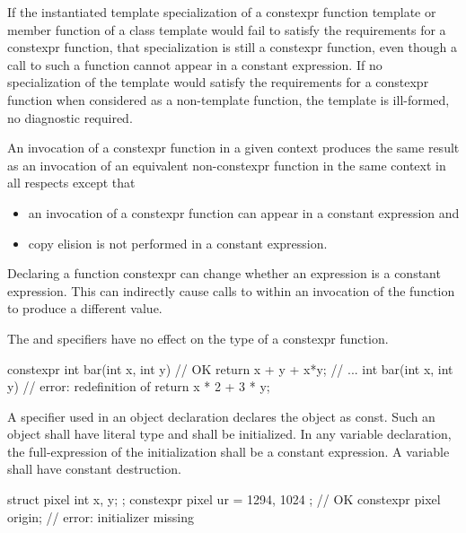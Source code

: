 \pnum
If the instantiated template specialization of a constexpr function
template
or member function of a class template
would fail to satisfy the requirements for a constexpr
function,
that specialization is still a constexpr function,
even though a call to such a function cannot appear in a constant
expression. If no specialization of the template would satisfy the
requirements for a constexpr function
when considered as a non-template function, the template is
ill-formed, no diagnostic required.

\pnum
An invocation of a constexpr function in a given context
produces the same result as
an invocation of an equivalent non-constexpr function in the same context
in all respects except that
\begin{itemize}
\item
an invocation of a constexpr function
can appear in a constant expression and
\item
copy elision is not performed in a constant expression.
\end{itemize}
\begin{note}
Declaring a function constexpr can change whether an expression
is a constant expression.
This can indirectly cause calls to 
within an invocation of the function to produce a different value.
\end{note}

\pnum
The  and  specifiers have no
effect on the type of a constexpr function.
\begin{example}
\begin{codeblock}
constexpr int bar(int x, int y)         // OK
    { return x + y + x*y; }
// ...
int bar(int x, int y)                   // error: redefinition of 
    { return x * 2 + 3 * y; }
\end{codeblock}
\end{example}

\pnum
A  specifier used in an object declaration
declares the object as const.
Such an object
shall have literal type and
shall be initialized.
In any  variable declaration,
the full-expression of the initialization
shall be a constant expression.
A  variable shall have constant destruction.
\begin{example}
\begin{codeblock}
struct pixel {
  int x, y;
};
constexpr pixel ur = { 1294, 1024 };    // OK
constexpr pixel origin;                 // error: initializer missing
\end{codeblock}
\end{example}

